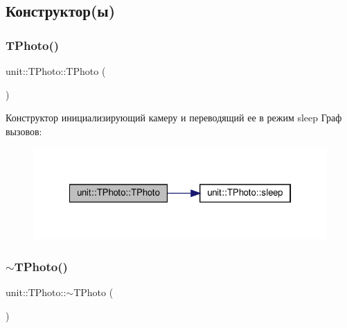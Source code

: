 \subsection{Конструктор(ы)}
\mbox{\label{classunit_1_1_t_photo_ac4d5d37e712767fa9b899648949b2ef3}} 
\subsubsection{\texorpdfstring{T\+Photo()}{TPhoto()}}
{\footnotesize\ttfamily unit\+::\+T\+Photo\+::\+T\+Photo (\begin{DoxyParamCaption}{ }\end{DoxyParamCaption})}



 Конструктор инициализирующий камеру и переводящий ее в режим sleep Граф вызовов\+:\nopagebreak
\begin{figure}[H]
\begin{center}
\leavevmode
\includegraphics[width=322pt]{classunit_1_1_t_photo_ac4d5d37e712767fa9b899648949b2ef3_cgraph}
\end{center}
\end{figure}
\mbox{\label{classunit_1_1_t_photo_a1c9c83e03a16b4e66a0fc48f734a5b93}} 
\subsubsection{\texorpdfstring{$\sim$\+T\+Photo()}{~TPhoto()}}
{\footnotesize\ttfamily unit\+::\+T\+Photo\+::$\sim$\+T\+Photo (\begin{DoxyParamCaption}{ }\end{DoxyParamCaption})\hspace{0.3cm}{\ttfamily [virtual]}}



